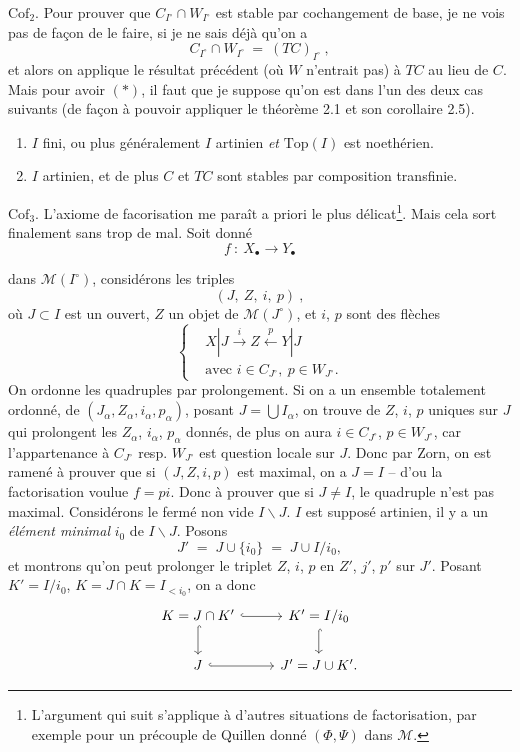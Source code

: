 \documentclass[11pt]{article}
\newcommand{\printedpage}[1]{\marginpar{\footnotesize p.~#1}}
\newcommand{\msp}[1]{\marginpar{\footnotesize [#1]}}
\newcommand{\M}{\mathcal{M}}
\begin{document}
$\mathrm{Cof}_2$. Pour prouver que $C_{I^\circ} \cap W_{I^\circ}$ est stable par cochangement de base, je ne vois pas de façon de le faire, si je ne sais déjà qu'on a
\[ C_{I^\circ} \cap W_{I^\circ} \ = \ (TC)_{I^\circ}\ , \tag*{$(*)$} \]
et alors on applique le résultat précédent (où $W$ n'entrait pas) à $TC$ au lieu de $C$. Mais pour avoir $(*)$, il faut que je suppose qu'on est dans l'un des deux cas suivants (de façon à pouvoir appliquer le théorème 2.1 et son corollaire 2.5).
\begin{enumerate}[leftmargin=2.5em]
\item[a)] $I$ fini, ou plus généralement $I$ artinien \textit{et} $\mathrm{Top}(I)$ est noethérien.
\item[b)] $I$ artinien, et de plus $C$ et $TC$ sont stables par composition transfinie.
\end{enumerate}
$\mathrm{Cof}_3$. L'axiome de facorisation me paraît a priori le plus délicat\footnote[15]{L'argument qui suit s'applique à d'autres situations de factorisation, par exemple pour un précouple de Quillen donné $(\Phi, \Psi)$ dans $\M$.}. Mais cela sort finalement sans trop de mal. Soit donné %
\[ f \ : \ X_\bullet \longrightarrow Y_\bullet \]

\printedpage{24}

\msp{45}dans $\mathcal{M}(I^\circ)$, considérons les triples
\[
(J,\ Z,\ i,\ p)\ ,
\]
où $J\subset I$ est un ouvert, $Z$ un objet de $\mathcal{M}(J^\circ)$, et $i$, $p$ sont des flèches
\[
\left\{
\begin{aligned}
& X|J \xrightarrow{\ i\ } Z \xleftarrow{\ p\ } Y|J \\
& \text{avec } i\in C_{J^\circ},\ p\in W_{J^\circ}.
\end{aligned}
\right.
\]
On ordonne les quadruples par prolongement. Si on a un ensemble totalement ordonné, de $(J_\alpha,Z_\alpha,i_\alpha,p_\alpha)$, posant $J=\bigcup I_\alpha$, on trouve de $Z$, $i$, $p$ uniques sur $J$ qui prolongent %
les $Z_\alpha$, $i_\alpha$, $p_\alpha$ donnés, de plus on aura $i\in C_{J^\circ}$, $p\in W_{J^\circ}$, car l'appartenance à $C_{J^\circ}$ resp. $W_{J^\circ}$ est question locale sur $J$. Donc par Zorn, on est ramené à prouver que si $(J,Z,i,p)$ est maximal, on a $J=I$ – d'ou la factorisation voulue $f=pi$. Donc à prouver que si %
$J\neq I$, le quadruple n'est pas maximal. Considérons le fermé non vide $I\backslash J$. $I$ est supposé artinien, il y a un \textit{élément minimal} $i_0$ de $I\backslash J$. Posons
\msp{46}
\[
J' \;=\; J\cup\{i_0\} \;=\; J\cup I/i_0,
\]
et montrons qu'on peut prolonger le triplet $Z$, $i$, $p$ en $Z'$, $j'$, $p'$ sur $J'$. Posant $K'=I/i_0$, %
$K=J\cap K=I_{<i_0}$, on a donc %
\[
\begin{tikzcd}
K=J\cap K' \arrow[r, hook] \arrow[d, hook] & K'=I/i_0 \arrow[d, hook] \\
J \arrow[r, hook] & J'=J\cup K'.
\end{tikzcd}
\]
\end{document}

